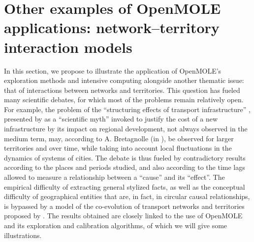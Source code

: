 \documentclass[10pt]{article}
\begin{document}
\section{Other examples of OpenMOLE applications: network–territory interaction models}

In this section, we propose to illustrate the application of OpenMOLE’s exploration methods and intensive computing alongside another thematic issue: that of interactions between networks and territories. This question has fueled many scientific debates, for which most of the problems remain relatively open. For example, the problem of the ``structuring effects of transport infrastructure'' \citep{bonnafous1974methodologies}, presented by \cite{offner1993effets} as a ``scientific myth'' invoked to justify the cost of a new infrastructure by its impact on regional development, not always observed in the medium term, may, according to A. Bretagnolle (in \cite{offner2014effets}), be observed for larger territories and over time, while taking into account local fluctuations in the dynamics of systems of cities. The debate is thus fueled by contradictory results according to the places and periods studied, and also according to the time lags allowed to measure a relationship between a ``cause'' and its ``effect''. The empirical difficulty of extracting general stylized facts, as well as the conceptual difficulty of geographical entities that are, in fact, in circular causal relationships, is bypassed by a model of the co-evolution of transport networks and territories proposed by \cite{raimbault2018modelisation}. The results obtained are closely linked to the use of OpenMOLE and its exploration and calibration algorithms, of which we will give some illustrations.
\end{document}
